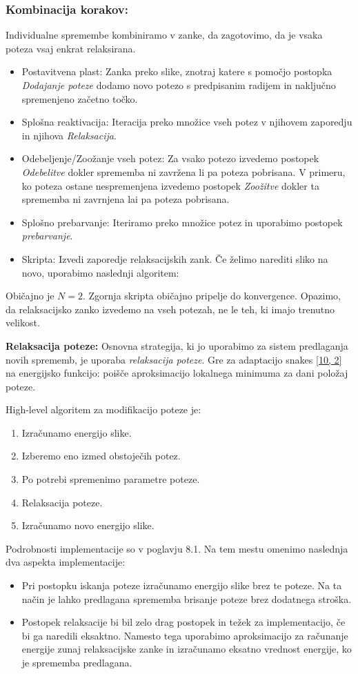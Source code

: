 \subsubsection{Kombinacija korakov:}
%
Individualne spremembe kombiniramo v zanke, da zagotovimo, da je vsaka poteza vsaj enkrat relaksirana.
%
\begin{itemize}
  \item Postavitvena plast: Zanka preko slike, znotraj katere s pomočjo postopka \textit{Dodajanje poteze} dodamo novo potezo s predpisanim radijem in naključno spremenjeno začetno točko.
  \item Splošna reaktivacija: Iteracija preko množice vseh potez v njihovem zaporedju in njihova \textit{Relaksacija}.
  \item Odebeljenje/Zoožanje vseh potez: Za vsako potezo izvedemo postopek \textit{Odebelitve} dokler sprememba ni zavržena li pa poteza pobrisana. V primeru, ko poteza ostane nespremenjena izvedemo postopek \textit{Zoožitve} dokler ta sprememba ni zavrnjena lai pa poteza pobrisana.
  \item Splošno prebarvanje: Iteriramo preko množice potez in uporabimo postopek \textit{prebarvanje}.
  \item Skripta: Izvedi zaporedje relaksacijskih zank. Če želimo narediti sliko na novo, uporabimo naslednji algoritem:
\end{itemize}
%
Običajno je $N=2$. Zgornja skripta običajno pripelje do konvergence. Opazimo, da relaksacijsko zanko izvedemo na vseh potezah, ne le teh, ki imajo trenutno velikost.

\textbf{Relaksacija poteze:} Osnovna strategija, ki jo uporabimo za sistem predlaganja novih sprememb, je uporaba \emph{relaksacija poteze}. Gre za adaptacijo snakes \ref{10, 2} na energijsko funkcijo: poišče aproksimacijo lokalnega minimuma za dani položaj poteze.

High-level algoritem za modifikacijo poteze je:
%
\begin{enumerate}
  \item Izračunamo energijo slike.
  \item Izberemo eno izmed obstoječih potez.
  \item Po potrebi spremenimo parametre poteze.
  \item Relaksacija poteze.
  \item Izračunamo novo energijo slike.
\end{enumerate}
%
Podrobnosti implementacije so v poglavju 8.1. Na tem mestu omenimo naslednja dva aspekta implementacije:
%
\begin{itemize}
  \item Pri postopku iskanja poteze izračunamo energijo slike brez te poteze. Na ta način je lahko predlagana sprememba brisanje poteze brez dodatnega stroška.
  \item Postopek relaksacije bi bil zelo drag postopek in težek za implementacijo, če bi ga naredili eksaktno. Namesto tega uporabimo aproksimacijo za računanje energije zunaj relaksacijske zanke in izračunamo eksatno vrednost energije, ko je sprememba predlagana.
\end{itemize}
%
